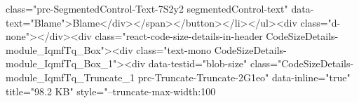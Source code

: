 class="prc-SegmentedControl-Text-7S2y2 segmentedControl-text" data-text="Blame">Blame</div></span></button></li></ul><div class="d-none"></div><div class="react-code-size-details-in-header CodeSizeDetails-module_IqmfTq_Box"><div class="text-mono CodeSizeDetails-module_IqmfTq_Box_1"><div data-testid="blob-size" class="CodeSizeDetails-module_IqmfTq_Truncate_1 prc-Truncate-Truncate-2G1eo" data-inline="true" title="98.2 KB" style="--truncate-max-width:100%